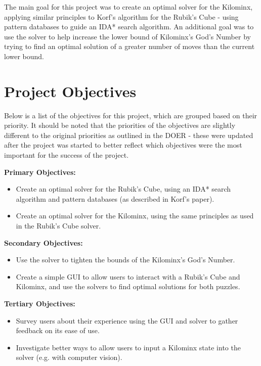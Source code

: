 The main goal for this project was to create an optimal solver for the Kilominx, applying similar principles to Korf's algorithm for the Rubik's Cube -  using pattern databases to guide an IDA* search algorithm. An additional goal was to use the solver to help increase the lower bound of Kilominx's God's Number by trying to find an optimal solution of a greater number of moves than the current lower bound.

\section{Project Objectives}
\label{section:objectives}
Below is a list of the objectives for this project, which are grouped based on their priority. It should be noted that the priorities of the objectives are slightly different to the original priorities as outlined in the DOER - these were updated after the project was started to better reflect which objectives were the most important for the success of the project.

\textbf{Primary Objectives:}
\begin{itemize}
    \item Create an optimal solver for the Rubik's Cube, using an IDA* search algorithm and pattern databases (as described in Korf's paper).
    \item Create an optimal solver for the Kilominx, using the same principles as used in the Rubik's Cube solver.
\end{itemize}

\textbf{Secondary Objectives:}
\begin{itemize}
    \item Use the solver to tighten the bounds of the Kilominx's God's Number.
    \item Create a simple GUI to allow users to interact with a Rubik's Cube and Kilominx, and use the solvers to find optimal solutions for both puzzles.
\end{itemize}

\textbf{Tertiary Objectives:}
\begin{itemize}
    \item Survey users about their experience using the GUI and solver to gather feedback on its ease of use.
    \item Investigate better ways to allow users to input a Kilominx state into the solver (e.g. with computer vision).
\end{itemize}